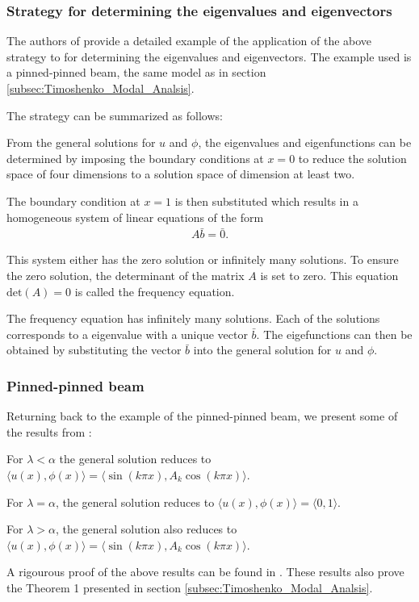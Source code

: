 \documentclass[../../main.tex]{subfiles}
\begin{document}
\subsubsection*{Strategy for determining the eigenvalues and eigenvectors}

The authors of \cite{VV06} provide a detailed example of the application of the above strategy to for determining the eigenvalues and eigenvectors. The example used is a pinned-pinned beam, the same model as in section \ref{subsec:Timoshenko_Modal_Analsis}.

The strategy can be summarized as follows:

From the general solutions for $u$ and $\phi$, the eigenvalues and eigenfunctions can be determined by imposing the boundary conditions at $x=0$ to reduce the solution space of four dimensions to a solution space of dimension at least two. 

The boundary condition at $x=1$ is then substituted which results in a homogeneous system of linear equations of the form
\begin{eqnarray*}
A \bar{b} = \bar{0}.
\end{eqnarray*} 

This system either has the zero solution or infinitely many solutions. To ensure the zero solution, the determinant of the matrix $A$ is set to zero. This equation $\textrm{det}(A) = 0$ is called the frequency equation.

The frequency equation has infinitely many solutions. Each of the solutions corresponds to a eigenvalue with a unique vector $\bar{b}$. The eigefunctions can then be obtained by substituting the vector $\bar{b}$ into the general solution for $u$ and $\phi$.

\subsubsection*{Pinned-pinned beam}

Returning back to the example of the pinned-pinned beam, we present some of the results from \cite{VV06}:

For $\lambda < \alpha$ the general solution reduces to $\langle u(x) , \phi(x) \rangle = \langle \sin(k \pi x), A_k \cos(k \pi x) \rangle$. 

For $\lambda = \alpha$, the general solution reduces to $\langle u(x) , \phi(x) \rangle = \langle 0, 1 \rangle$.

For $\lambda > \alpha$, the general solution also reduces to $\langle u(x) , \phi(x) \rangle = \langle \sin(k \pi x), A_k  \cos(k \pi x) \rangle$. 


A rigourous proof of the above results can be found in \cite{VV06}. These results also prove the Theorem 1 presented in section \ref{subsec:Timoshenko_Modal_Analsis}.
\end{document}
